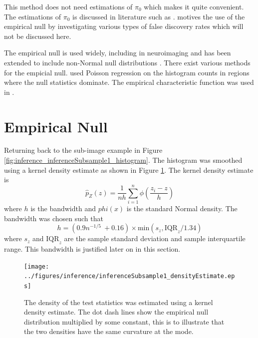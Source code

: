 This method does not need estimations of $\pi_0$ which makes it quite convenient. The estimations of $\pi_0$ is discussed in literature such as \cite{benjamini2000adaptive, pounds2003estimating, storey2003statistical, pounds2004improving, langaas2005estimating, durnez2014posthoc}. \cite{efron2004large} motives the use of the empirical null by investigating various types of false discovery rates \citep{storey2002direct, storey2003positive, efron2002empirical, efron2007size} which will not be discussed here.

The empirical null is used widely, including in neuroimaging \citep{schwartzman2008false, schwartzman2009empirical} and has been extended to include non-Normal null distributions \citep{schwartzman2008false, schwartzman2008empirical}. There exist various methods for the empicial null. \cite{schwartzman2008empirical} used Poisson regression on the histogram counts in regions where the null statistics dominate. The empirical characteristic function was used in \cite{jin2007estimating}.

\section{Empirical Null}

Returning back to the sub-image example in Figure \ref{fig:inference_inferenceSubsample1_histogram}. The histogram was smoothed using a kernel density estimate \citep{parzen1962on, friedman2001elements} as shown in Figure \ref{fig:inference_inferenceSubsample1_densityEstimate}. The kernel density estimate \citep{parzen1962on} is
\begin{equation}
  \widehat{p}_Z(z)=
  \frac{1}{nh}
  \sum_{i=1}^n\phi\left(
    \dfrac{z_i-z}{h}
  \right)
  \label{eq:inference_kernel_density_estimate}
\end{equation}
where $h$ is the bandwidth and $phi(x)$ is the standard Normal density. The bandwidth was chosen such that
\begin{equation}
  h = (0.9n^{-1/5}\ + 0.16) \times \text{min}\left(s_z,\text{IQR}_z/1.34\right)
  \label{eq:inference_ourruleofthumb}
\end{equation}
where $s_z$ and $\text{IQR}_z$ are the sample standard deviation and sample interquartile range. This bandwidth is justified later on in this section.

\begin{figure}
  \centering
  \texttt{[image: ../figures/inference/inferenceSubsample1\_densityEstimate.eps]}
  \caption{The density of the test statistics was estimated using a kernel density estimate. The dot dash lines show the empirical null distribution multiplied by some constant, this is to illustrate that the two densities have the same curvature at the mode.}
  \label{fig:inference_inferenceSubsample1_densityEstimate}
\end{figure}

